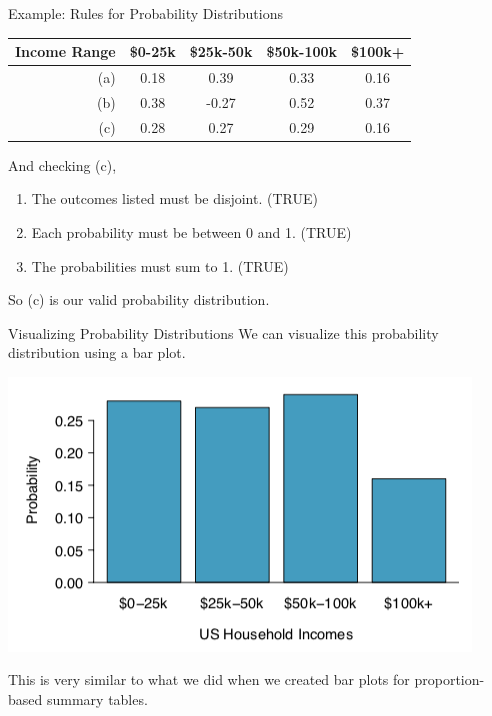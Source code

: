 \begin{frame}{Example: Rules for Probability Distributions}
    \begin{tabular}{r|cccc}
        \hline
        Income Range & \$0-25k & \$25k-50k & \$50k-100k & \$100k+ \\ \hline
        (a) & 0.18 & 0.39 & 0.33 & 0.16 \\
        (b) & 0.38 & -0.27 & 0.52 & 0.37 \\
        (c) & 0.28 & 0.27 & 0.29 & 0.16\\ \hline
    \end{tabular}
    
    \vspace{12pt}And checking (c),
    \begin{enumerate}
        \item The outcomes listed must be disjoint. (TRUE)
        \item Each probability must be between 0 and 1. (TRUE)
        \item The probabilities must sum to 1. (TRUE)
    \end{enumerate}
    So (c) is our valid probability distribution.
\end{frame}

\begin{frame}{Visualizing Probability Distributions}
    We can visualize this probability distribution using a bar plot.
    \begin{center}
        \includegraphics[scale=0.5]{images/probplot.png}
    \end{center}
    This is very similar to what we did when we created bar plots for proportion-based summary tables.
\end{frame}

